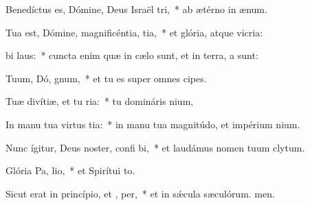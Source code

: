 \item Benedíctus es, Dómine, Deus Israël  tri,~* ab ætérno in ænum.
\item Tua est, Dómine, magnificéntia,  tia,~* et glória, atque vicria:
\item {} bi laus:~* cuncta enim quæ in cælo sunt, et in terra, a sunt:
\item Tuum, Dó, gnum,~* et tu es super omnes cipes.
\item Tuæ divítiæ, et tu  ria:~* tu domináris nium,
\item In manu tua virtus  tia:~* in manu tua magnitúdo, et impérium nium.
\item Nunc ígitur, Deus noster, confi bi,~* et laudámus nomen tuum clytum.
\item Glória Pa,  lio,~* et Spirítui to.
\item Sicut erat in princípio, et ,  per,~* et in sǽcula sæculórum. men.
